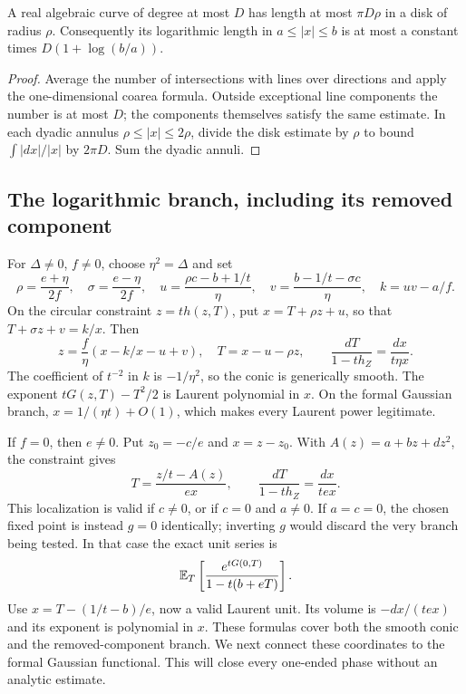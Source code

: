 \begin{lemma}\label{lem:curvelength}
A real algebraic curve of degree at most $D$ has length at most
$\pi D\rho$ in a disk of radius $\rho$. Consequently its logarithmic
length in $a\leq|x|\leq b$ is at most a constant times
$D(1+\log(b/a))$.
\end{lemma}
\begin{proof}
Average the number of intersections with lines over directions and
apply the one-dimensional coarea formula. Outside exceptional line
components the number is at most $D$; the components themselves
satisfy the same estimate. In each dyadic annulus
$\rho\leq|x|\leq2\rho$, divide the disk estimate by $\rho$ to
bound $\int|dx|/|x|$ by $2\pi D$. Sum the dyadic annuli.
\end{proof}

\subsection{The logarithmic branch, including its removed component}

For $\Delta\ne0$, $f\ne0$, choose $\eta^2=\Delta$ and set
\[
 \rho=\frac{e+\eta}{2f},\quad \sigma=\frac{e-\eta}{2f},\quad
 u=\frac{\rho c-b+1/t}{\eta},\quad
 v=\frac{b-1/t-\sigma c}{\eta},\quad k=uv-a/f.
\]
On the circular constraint $z=th(z,T)$, put
$x=T+\rho z+u$, so that $T+\sigma z+v=k/x$. Then
\[
 z=\frac f\eta(x-k/x-u+v),\quad T=x-u-\rho z,
 \qquad
 \frac{dT}{1-th_Z}=\frac{dx}{t\eta x}.
\]
The coefficient of $t^{-2}$ in $k$ is $-1/\eta^2$, so the conic
is generically smooth. The exponent $tG(z,T)-T^2/2$ is Laurent
polynomial in $x$. On the formal Gaussian branch,
$x=1/(\eta t)+O(1)$, which makes every Laurent power legitimate.

If $f=0$, then $e\ne0$. Put $z_0=-c/e$ and $x=z-z_0$. With
$A(z)=a+bz+dz^2$, the constraint gives
\[
 T=\frac{z/t-A(z)}{ex},\qquad
 \frac{dT}{1-th_Z}=\frac{dx}{tex}.
\]
This localization is valid if $c\ne0$, or if $c=0$ and $a\ne0$.
If $a=c=0$, the chosen fixed point is instead $g=0$ identically;
inverting $g$ would discard the very branch being tested. In that
case the exact unit series is
\[
 \mathbb E_T\left[\frac{e^{tG(0,T)}}{1-t(b+eT)}\right].
\]
Use $x=T-(1/t-b)/e$, now a valid Laurent unit. Its volume is
$-dx/(tex)$ and its exponent is polynomial in $x$. These formulas
cover both the smooth conic and the removed-component branch.
We next connect these coordinates to the formal Gaussian functional.
This will close every one-ended phase without an analytic estimate.

